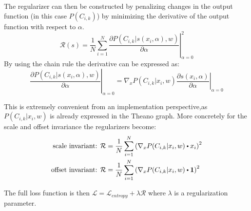 The regularizer can then be constructed by penalizing changes in the output function (in this case $P(C_{i, k})$) by minimizing the derivative of the output function with respect to $\alpha$.
\begin{equation}
\mathcal{R}(s) = \frac{1}{N} \sum_{i=1}^N \left. \frac{\partial P(C_{i, k} | s(x_i, \alpha), w)}{\partial \alpha} \right|^2_{\alpha=0}
\end{equation}
By using the chain rule the derivative can be expressed as:
\begin{equation*}
\left. \frac{\partial P(C_{i, k} | s(x_i, \alpha), w)}{\partial \alpha} \right|_{\alpha=0} = \left.\nabla_x P(C_{i, k} |  x_i, w) \frac{\partial s(x_i, \alpha)}{\partial \alpha} \right|_{\alpha=0}
\end{equation*}

This is extremely convenient from an implementation perspective,as $P(C_{i, k} | x_i, w)$ is already expressed in the Theano graph. More concretely for the scale and offset invariance the regularizers become:
\begin{align}
\text{scale invariant: }& \mathcal{R} = \frac{1}{N} \sum_{i=1}^N \left(\nabla_x P(C_{i, k} | x_i, w) \bigcdot x_i\right)^2 \\
\text{offset invariant: }& \mathcal{R} = \frac{1}{N} \sum_{i=1}^N \left(\nabla_x P(C_{i, k} | x_i, w) \bigcdot \mathbf{1}\right)^2
\end{align}

The full loss function is then $\mathcal{L} = \mathcal{L}_{entropy} + \lambda \mathcal{R}$ where $\lambda$ is a regularization parameter.

